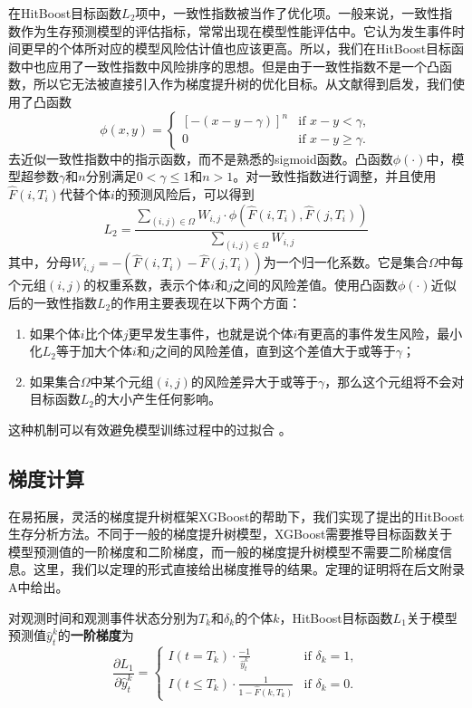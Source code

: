 在HitBoost目标函数$L_2$项中，一致性指数被当作了优化项。一般来说，一致性指数作为生存预测模型的评估指标，常常出现在模型性能评估中。它认为发生事件时间更早的个体所对应的模型风险估计值也应该更高。所以，我们在HitBoost目标函数中也应用了一致性指数中风险排序的思想。但是由于一致性指数不是一个凸函数，所以它无法被直接引入作为梯度提升树的优化目标。从文献\cite{Yan2004pre}得到启发，我们使用了凸函数
\begin{equation}
\phi(x,y)=
\begin{cases}
{[-(x-y-\gamma)]}^n & \text{if } x-y < \gamma,\\
0 & \text{if } x-y \ge \gamma.
\end{cases}
\end{equation}
去近似一致性指数中的指示函数，而不是熟悉的sigmoid函数。凸函数$\phi(\cdot)$中，模型超参数$\gamma$和$n$分别满足$0<\gamma \le 1$和$n>1$。对一致性指数进行调整，并且使用$\hat{F}(i, T_i)$代替个体$i$的预测风险后，可以得到
\begin{equation}
L_2 = \frac{\sum_{(i,j)\in \Omega} W_{i,j}\cdot \phi(\hat{F}(i, T_i), \hat{F}(j, T_i))}{\sum_{(i,j)\in \Omega} W_{i,j}}
\end{equation}
其中，分母$W_{i,j}=-\left( \hat{F}(i, T_i) - \hat{F}(j, T_i) \right)$为一个归一化系数。它是集合$\Omega$中每个元组$(i,j)$的权重系数，表示个体$i$和$j$之间的风险差值。使用凸函数$\phi(\cdot)$近似后的一致性指数$L_2$的作用主要表现在以下两个方面：
\begin{enumerate}
    \item 如果个体$i$比个体$j$更早发生事件，也就是说个体$i$有更高的事件发生风险，最小化$L_2$等于加大个体$i$和$j$之间的风险差值，直到这个差值大于或等于$\gamma$；
    \item 如果集合$\Omega$中某个元组$(i,j)$的风险差异大于或等于$\gamma$，那么这个元组将不会对目标函数$L_2$的大小产生任何影响。
\end{enumerate}
这种机制可以有效避免模型训练过程中的过拟合 。

\subsection{梯度计算}

在易拓展，灵活的梯度提升树框架XGBoost的帮助下，我们实现了提出的HitBoost生存分析方法。不同于一般的梯度提升树模型，XGBoost需要推导目标函数关于模型预测值的一阶梯度和二阶梯度，而一般的梯度提升树模型不需要二阶梯度信息。这里，我们以定理的形式直接给出梯度推导的结果。定理的证明将在后文附录A中给出。

\begin{theorem}\label{thm:1.1}
对观测时间和观测事件状态分别为$T_k$和$\delta_k$的个体$k$，HitBoost目标函数$L_1$关于模型预测值$\hat{y}_t^k$的\textbf{一阶梯度}为$$
\frac{\partial L_1}{\partial \hat{y}_t^k}=
\begin{cases}
I(t=T_k)\cdot \frac{-1}{\hat{y}_t^k} & \text{if } \delta_k = 1,\\
I(t\le T_k)\cdot \frac{1}{1-\hat{F}(k, T_k)} & \text{if } \delta_k = 0.
\end{cases}
$$
\end{theorem}

